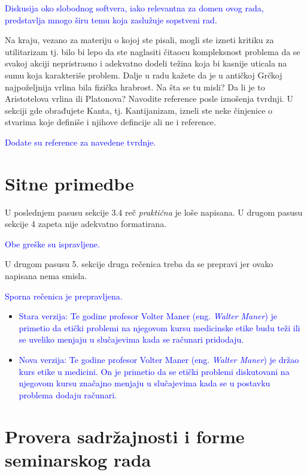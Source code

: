 \documentclass[a4paper]{report}
\newcommand{\odgovor}[1]{\textcolor{blue}{#1}}
\begin{document}
\odgovor{Diskusija oko slobodnog softvera, iako relevantna za domen ovog rada, predstavlja mnogo širu temu koja zaslužuje sopstveni rad.}

Na kraju, vezano za materiju o kojoj ste pisali, mogli ste izneti kritiku za utilitarizam tj. 
bilo bi lepo da ste naglasiti čitaocu kompleksnost problema da se svakoj akciji 
nepristrasno i adekvatno dodeli težina koja bi kasnije uticala na sumu koja karakteriše problem.
Dalje u radu kažete da je u antičkoj Grčkoj najpoželjnija vrlina bila fizička hrabrost. Na šta se tu misli? Da li
je to Aristotelova vrlina ili Platonova? Navodite reference posle iznošenja tvrdnji. U sekciji gde obrađujete Kanta, tj. Kantijanizam, izneli ste neke činjenice o stvarima koje definiše i njihove defincije ali ne i reference.

\odgovor{Dodate su reference za navedene tvrdnje.}

\section{Sitne primedbe}
U poslednjem pasusu sekcije 3.4 reč \textit{praktična} je loše napisana.
U drugom pasusu sekcije 4 zapeta nije adekvatno formatirana.

\odgovor{Obe greške su ispravljene.}

U drugom pasusu 5. sekcije druga rečenica treba da se prepravi jer ovako napisana nema smisla.

\odgovor{Sporna rečenica je prepravljena.}
\begin{itemize}
\item \odgovor{Stara verzija:
Te godine profesor Volter Maner (eng. \textit{Walter Maner}) je primetio da etički problemi na njegovom kursu medicinske etike budu teži ili se uveliko menjaju u slučajevima kada se računari pridodaju.}
\item \odgovor{Nova verzija:
Te godine profesor Volter Maner (eng. \textit{Walter Maner}) je držao kurs etike u medicini. On je primetio da se etički problemi diskutovani na njegovom kursu značajno menjaju u slučajevima kada se u postavku problema dodaju računari.}

\end{itemize}

\section{Provera sadržajnosti i forme seminarskog rada}
\end{document}
